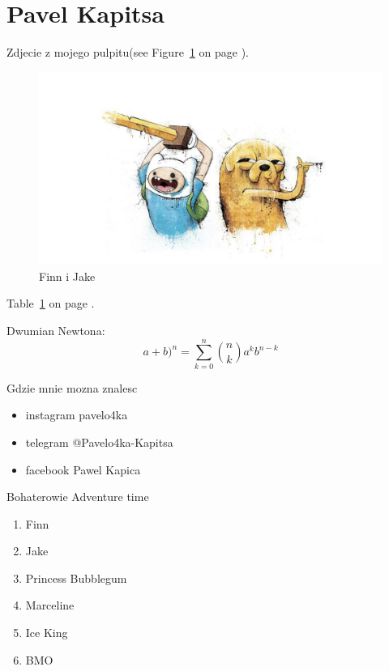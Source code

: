 \section{Pavel Kapitsa}
\label{sec:Pavel Kapitsa}

Zdjecie z mojego pulpitu(see Figure~\ref{fig:time} on page \pageref{fig:time}).

\begin{figure}[htbp]
    \centering
    \includegraphics[width=1\textwidth]{pictures/adventure-time.jpg}
    \caption{Finn i Jake}
    \label{fig:time}
\end{figure}
Table~\ref{sec:Pavel Kapitsa} on page \pageref{sec:Pavel Kapitsa}.


Dwumian Newtona: 
\[a+b)^n=\sum_{k=0}^{n}\binom{n}{k}a^kb^{n-k}\]
\newpage

Gdzie mnie mozna znalesc
\begin{itemize}
    \item instagram pavelo4ka
    \item telegram @Pavelo4ka-Kapitsa 
    \item facebook Pawel Kapica
\end{itemize}

\Large Bohaterowie Adventure time
\begin{enumerate}
    \item Finn
    \item Jake
    \item Princess Bubblegum
    \item Marceline
    \item Ice King
    \item BMO
\end{enumerate}

